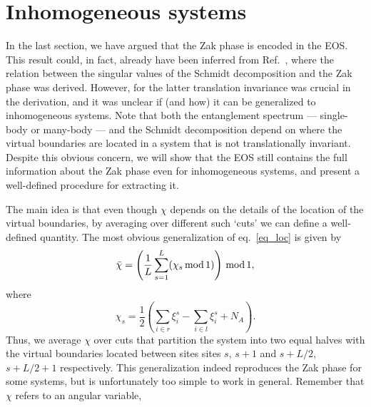 \documentclass[twocolumn,amsmath,longbibliography,amssymb,superscriptaddress]{revtex4-1}
\newcommand{\carlos}[1]{{\color{red} #1}}
\begin{document}

\section{Inhomogeneous systems}

In the last section, we have argued that the Zak phase is encoded in the EOS. 
This result could, in fact, already have been inferred from Ref.~\cite{Zaletel2014}, where the relation between the singular values of the Schmidt decomposition and the Zak phase was derived. 
However, for the latter translation invariance was crucial in the derivation, and it was unclear if (and how) it can be generalized to inhomogeneous systems.
Note that both the entanglement spectrum --- single-body or many-body --- and the Schmidt decomposition depend on where the virtual boundaries are located in a system that is not translationally invariant.
Despite this obvious concern, we will show that the EOS still contains the full information about the Zak phase even for inhomogeneous systems, and present a well-defined procedure for extracting it. 

The main idea is that even though $\chi$ depends on the details of the location of the virtual boundaries, by averaging over different such `cuts' we can define a well-defined quantity. 
The most obvious generalization of eq.~\eqref{eq_loc} is given by 
\begin{align}
\bar{\chi} =\left(\frac{1}{L}\sum_{s=1}^L (\chi_s \, \rm{mod} \, 1)\right)\, \rm{mod} \, 1,
\label{eq:inh_simple}
\end{align}
where
\begin{equation}
\chi_s = \frac{1}{2} \left( \sum_{i\in r}\xi^s_i-\sum_{i\in l}\xi^s_i  + N_A \right). 
\end{equation}
Thus, we average $\chi$ over cuts that partition the system into two equal halves with the virtual boundaries located between sites sites $s$, $s+1$ and $s+L/2$,$s+L/2+1$ respectively. 
This generalization indeed reproduces the Zak phase for some systems, but is unfortunately too simple to work in general. 
Remember that $\chi$ refers to an angular variable, 
\end{document}
